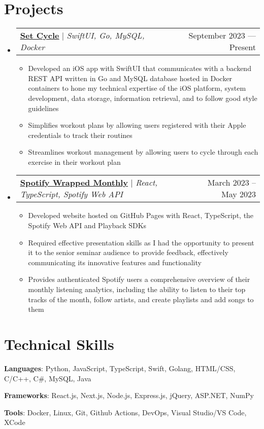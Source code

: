 \documentclass[letterpaper,11pt]{article}
\makeatletter
\newcommand{\resumeItem}[1]{
  \item\small{
	{#1 \vspace{-2pt}}
  }
}
\newcommand{\resumeProjectHeading}[2]{
	\item
	\begin{tabular*}{0.97\textwidth}{l@{\extracolsep{\fill}}r}
	  \small#1 & #2 \\
	\end{tabular*}\vspace{-7pt}
}
\newcommand{\resumeSubHeadingListStart}{\begin{itemize}[leftmargin=0.15in, label={}]}
\newcommand{\resumeSubHeadingListEnd}{\end{itemize}}
\newcommand{\resumeItemListStart}{\begin{itemize}}
\newcommand{\resumeItemListEnd}{\end{itemize}\vspace{-5pt}}
\makeatother
\begin{document}
\section{Projects}
\resumeSubHeadingListStart
\resumeProjectHeading
	{\textbf{\href{https://github.com/jordanwmckee/set-cycle}{\underline{Set Cycle}}} $|$ \emph{SwiftUI, Go, MySQL, Docker}}{September 2023 --- Present}
	\resumeItemListStart
		\resumeItem{Developed an iOS app with SwiftUI that communicates with a backend REST API written in Go and MySQL database hosted in Docker containers to hone my technical expertise of the iOS platform, system development, data storage, information retrieval, and to follow good style guidelines}
		\resumeItem{Simplifies workout plans by allowing users registered with their Apple credentials to track their routines}
		\resumeItem{Streamlines workout management by allowing users to cycle through each exercise in their workout plan}
	\resumeItemListEnd
\resumeProjectHeading
	{\textbf{\href{https://github.com/jordanwmckee/spotify-wrapped}{\underline{Spotify Wrapped Monthly}}} $|$ \emph{React, TypeScript, Spotify Web API}}{March 2023 -- May 2023 }
	\resumeItemListStart
		\resumeItem{Developed website hosted on GitHub Pages with React, TypeScript, the Spotify Web API and Playback SDKs}
		\resumeItem{Required effective presentation skills as I had the opportunity to present it to the senior seminar audience to provide feedback, effectively communicating its innovative features and functionality}
		\resumeItem{Provides authenticated Spotify users a comprehensive overview of their monthly listening analytics, including the ability to listen to their top tracks of the month, follow artists, and create playlists and add songs to them}
	\resumeItemListEnd
\resumeSubHeadingListEnd

\section{Technical Skills}
 \begin{itemize}[leftmargin=0.15in, label={}]
	\small{
	  \item{\textbf{Languages}: Python, JavaScript, TypeScript, Swift, Golang, HTML/CSS, C/C++, C\#, MySQL, Java}
	  \item{\textbf{Frameworks}: React.js, Next.js, Node.js, Express.js, jQuery, ASP.NET, NumPy}
	  \item{\textbf{Tools}: Docker, Linux, Git, Github Actions, DevOps, Visual Studio/VS Code, XCode}
	  }
 \end{itemize}

\end{document}

